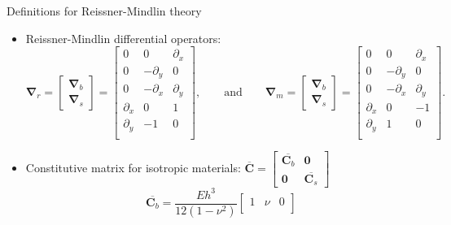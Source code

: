 \documentclass[aspectratio=169]{beamer}
\begin{document}
{  \begin{frame}{Definitions for Reissner-Mindlin theory}
    \begin{itemize}
      \item Reissner-Mindlin differential operators:
            {\small$$\boldsymbol\nabla_r=\begin{bmatrix}
                \boldsymbol\nabla_b \\ \boldsymbol\nabla_s
              \end{bmatrix}=\begin{bmatrix}
                0          & 0           & \partial_x \\
                0          & -\partial_y & 0          \\
                0          & -\partial_x & \partial_y \\
                \partial_x & 0           & 1          \\
                \partial_y & -1          & 0          \\
              \end{bmatrix},\qquad\text{and}\qquad \boldsymbol\nabla_m=\begin{bmatrix}
                \boldsymbol\nabla_b \\ \boldsymbol\nabla_s
              \end{bmatrix}=\begin{bmatrix}
                0          & 0           & \partial_x \\
                0          & -\partial_y & 0          \\
                0          & -\partial_x & \partial_y \\
                \partial_x & 0           & -1         \\
                \partial_y & 1           & 0          \\
              \end{bmatrix}.$$}
      \item Constitutive matrix for isotropic materials: {\small$\overline{\boldsymbol{C}}=\begin{bmatrix}\overline{\boldsymbol{C}_b} & \mathbf 0                   \\
               \mathbf 0                   & \overline{\boldsymbol{C}_s}
              \end{bmatrix}$}
            {\small$$ \overline{\boldsymbol{C}_b}=\frac{Eh^3}{12(1 - \nu^2)}\begin{bmatrix}
                1   & \nu & 0                 \\

\end{bmatrix}$$}
\end{itemize}
\end{frame}}
\end{document}
